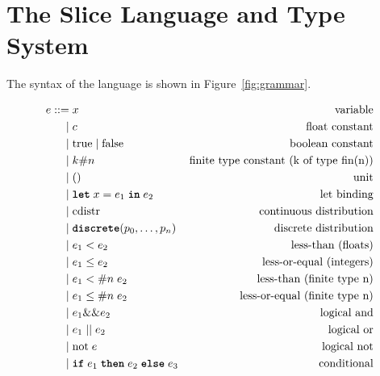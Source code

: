 \documentclass[acmsmall,screen,dvipsnames,x11names,nonacm,anonymous,review]{acmart}
\begin{document}





\section{The Slice Language and Type System}\label{sec:language}

The syntax of the \Slice{} language is shown in Figure~\ref{fig:grammar}.

\begin{figure}[h]
\begin{align*}
e ::= &\; x                               & \text{variable} \\
    | &\; c                               & \text{float constant} \\
    | &\; \text{true} \mid \text{false}   & \text{boolean constant} \\
    | &\; k\#n                            & \text{finite type constant (k of type fin(n))} \\
    | &\; ()                              & \text{unit} \\
    | &\; \letkw \; x = e_1\; \inkw \; e_2  & \text{let binding} \\
    | &\; \text{cdistr}                   & \text{continuous distribution} \\
    | &\; \discrete(p_0, \ldots, p_{n})      & \text{discrete distribution} \\
    | &\; e_1 < e_2                       & \text{less-than (floats)} \\
    | &\; e_1 \leq e_2                    & \text{less-or-equal (integers)} \\
    | &\; e_1 <\#n\; e_2                  & \text{less-than (finite type n)} \\
    | &\; e_1 \leq\#n\; e_2               & \text{less-or-equal (finite type n)} \\
    | &\; e_1 \&\& e_2                    & \text{logical and} \\
    | &\; e_1 \mid\mid e_2                & \text{logical or} \\
    | &\; \text{not}\; e                  & \text{logical not} \\
    | &\; \ifkw \; e_1\; \thenkw \; e_2\; \elsekw \; e_3 & \text{conditional} \\

\end{align*}
\end{figure}
\end{document}

